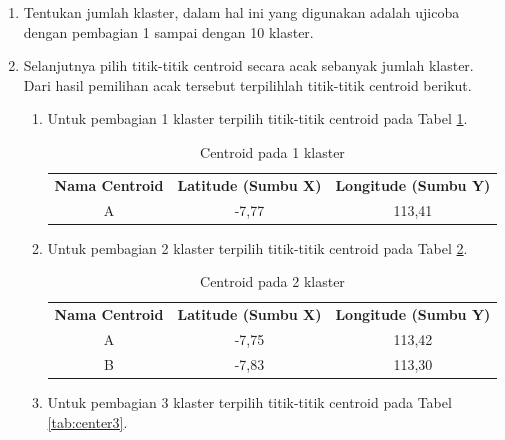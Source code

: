 \begin{enumerate}
	\item Tentukan jumlah klaster, dalam hal ini yang digunakan adalah ujicoba dengan pembagian 1 sampai dengan 10 klaster.
	\item Selanjutnya pilih titik-titik centroid secara acak sebanyak jumlah klaster. Dari hasil pemilihan acak tersebut terpilihlah titik-titik centroid berikut.
	
	\begin{enumerate}
	
	\item Untuk pembagian 1 klaster terpilih titik-titik centroid pada Tabel \ref{tab:center1}.
	
\begin{table}[H]
\footnotesize
\centering
\begin{tabular}{ccc}
\rowcolor[HTML]{4472C4} 
{\color[HTML]{FFFFFF} \textbf{Nama   Centroid}} & {\color[HTML]{FFFFFF} \textbf{Latitude (Sumbu X)}} & {\color[HTML]{FFFFFF} \textbf{Longitude (Sumbu Y)}} \\
\rowcolor[HTML]{D9E1F2} 
A &
  -7,77 &
  113,41
\end{tabular}
\caption{Centroid pada 1 klaster}
\label{tab:center1}
\end{table}


	\item Untuk pembagian 2 klaster terpilih titik-titik centroid pada Tabel \ref{tab:center2}.

\begin{table}[H]
\footnotesize
\centering
\begin{tabular}{ccc}
\rowcolor[HTML]{4472C4} 
{\color[HTML]{FFFFFF} \textbf{Nama   Centroid}} & {\color[HTML]{FFFFFF} \textbf{Latitude (Sumbu X)}} & {\color[HTML]{FFFFFF} \textbf{Longitude (Sumbu Y)}} \\
\rowcolor[HTML]{D9E1F2} 
A                                               & -7,75                                              & 113,42                                              \\
B                                               & -7,83                                              & 113,30                                             
\end{tabular}
\caption{Centroid pada 2 klaster}
\label{tab:center2}
\end{table}

	\item Untuk pembagian 3 klaster terpilih titik-titik centroid pada Tabel \ref{tab:center3}.
	

\end{enumerate}
\end{enumerate}
